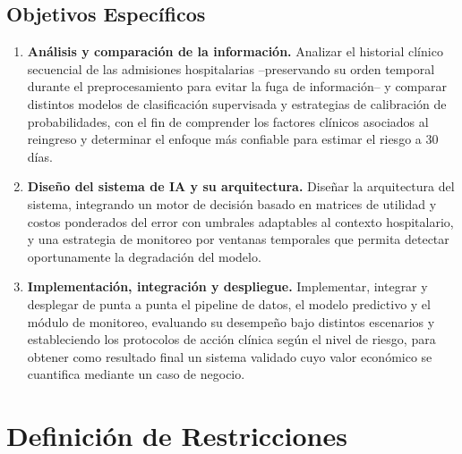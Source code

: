\documentclass[11pt,a4paper]{article}
\begin{document}
\subsection{Objetivos Específicos}
\begin{enumerate}[leftmargin=*]
    \item \textbf{Análisis y comparación de la información.} Analizar el historial clínico secuencial de las admisiones hospitalarias --preservando su orden temporal durante el preprocesamiento para evitar la fuga de información-- y comparar distintos modelos de clasificación supervisada y estrategias de calibración de probabilidades, con el fin de comprender los factores clínicos asociados al reingreso y determinar el enfoque más confiable para estimar el riesgo a 30 días.
    \item \textbf{Diseño del sistema de IA y su arquitectura.} Diseñar la arquitectura del sistema, integrando un motor de decisión basado en matrices de utilidad y costos ponderados del error con umbrales adaptables al contexto hospitalario, y una estrategia de monitoreo por ventanas temporales que permita detectar oportunamente la degradación del modelo.
    \item \textbf{Implementación, integración y despliegue.} Implementar, integrar y desplegar de punta a punta el pipeline de datos, el modelo predictivo y el módulo de monitoreo, evaluando su desempeño bajo distintos escenarios y estableciendo los protocolos de acción clínica según el nivel de riesgo, para obtener como resultado final un sistema validado cuyo valor económico se cuantifica mediante un caso de negocio.
\end{enumerate}

\section{Definición de Restricciones}
\label{sec:restricciones}
\end{document}
